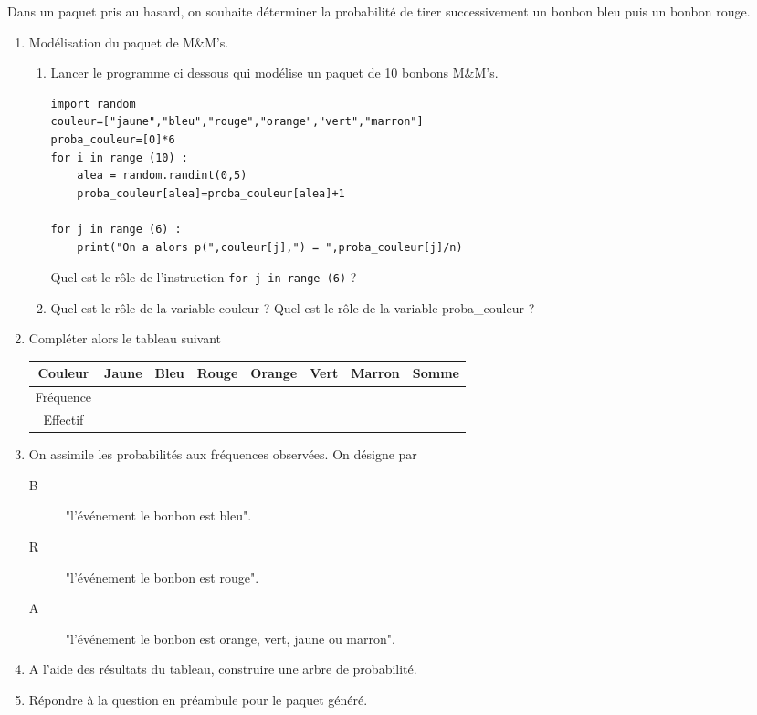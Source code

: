 
Dans un paquet pris au hasard, on souhaite déterminer la probabilité de tirer successivement un
bonbon bleu puis un bonbon rouge.

\begin{enumerate}
\item Modélisation du paquet de M\&M's.
\begin{enumerate}
\item  Lancer le programme ci dessous qui modélise un paquet de 10 bonbons M\&M's. 

\begin{center}
\begin{lstlisting}
import random
couleur=["jaune","bleu","rouge","orange","vert","marron"]
proba_couleur=[0]*6
for i in range (10) :
    alea = random.randint(0,5)
    proba_couleur[alea]=proba_couleur[alea]+1
    
for j in range (6) :
    print("On a alors p(",couleur[j],") = ",proba_couleur[j]/n)
\end{lstlisting}
\end{center}

Quel est le rôle de l'instruction \texttt{for j in range (6)} ?

\item Quel est le rôle de la variable couleur ? Quel est le rôle de la variable proba\_couleur ?
\end{enumerate}
\item Compléter alors le tableau suivant

\begin{tabular}{|c|c|c|c|c|c|c|c|}
\hline 
Couleur& Jaune& Bleu& Rouge &Orange& Vert& Marron&Somme\\ 
\hline 
Fréquence&&&&&&&\\ 
\hline 
Effectif&&&&&&&\\ 
\hline 
\end{tabular} 

\item On assimile les probabilités aux fréquences observées.
On désigne par
\begin{description}
\item[B] "l'événement le bonbon est bleu".
\item[R] "l'événement le bonbon est rouge".
\item[A] "l'événement le bonbon est orange, vert, jaune ou marron".
\end{description}
\item A l'aide des résultats du tableau, construire une arbre de probabilité.
\item Répondre à la question en préambule pour le paquet généré.
\end{enumerate}